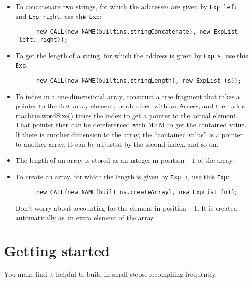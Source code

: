 \documentclass[11pt]{article}
\begin{document}
\begin{itemize}
\item To concatenate two strings, for which the addresses are given by \verb'Exp left' and \verb'Exp right', use this \verb'Exp':
\begin{verbatim}
      new CALL(new NAME(builtins.stringConcatenate), new ExpList (left, right));
\end{verbatim}

\item To get the length of a string, for which the address is given by \verb'Exp s', use this \verb'Exp':
\begin{verbatim}
      new CALL(new NAME(builtins.stringLength), new ExpList (s));
\end{verbatim}

\item To index in a one-dimensional array, construct a tree fragment that takes a pointer to the first array element, as obtained with an Access, and then adds machine.wordSize() times the index to get a pointer to the actual element.  That pointer then can be dereferenced with MEM to get the contained value.  If there is another dimension to the array, the ``contained value'' is a pointer to another array.  It can be adjusted by the second index, and so on.

\item The length of an array is stored as an integer in position $-1$ of the array.

\item To create an array, for which the length is given by \verb'Exp n', use this \verb'Exp':
\begin{verbatim}
      new CALL(new NAME(builtins.createArray), new ExpList (n));
\end{verbatim}
Don't worry about accounting for the element in position $-1$.  It is created automatically as an extra element of the array.
\end{itemize}

\section{Getting started}
You make find it helpful to build in small steps, recompiling frequently.
\end{document}
